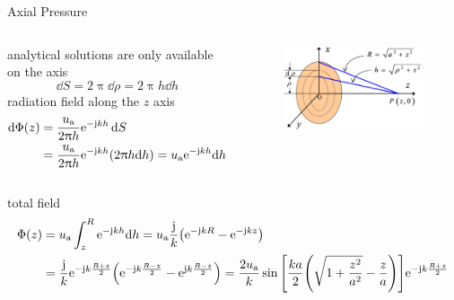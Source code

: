 \documentclass[9pt,mathserif]{beamer}
\begin{document}
\begin{frame}{Axial Pressure}
	\begin{columns}
		\begin{outline}
			\1 analytical solutions are only available on the axis
			$$\dd S  =2\uppi \dd \rho = 2\uppi h \dd h$$
			\1 radiation field along the $z$ axis
			\begin{align*}
				\dd \Phi(z) &= \frac{u_\text{a}}{2\uppi h} \mathrm{e}^{-\mathrm{j} k h}\dd{S}\\
				&= \frac{u_\text{a}}{2\uppi h} \mathrm{e}^{-\mathrm{j} k h} (2\uppi h \dd h)
				=u_\text{a} \mathrm{e}^{-\mathrm{j} kh} \dd h
			\end{align*}
		\end{outline}
		\column{0.5\textwidth}
		\begin{figure}
			\centering
			\includegraphics[width=\textwidth]{img/radi/circularPistonSourceAxis.jpg}
		\end{figure}
	\end{columns}
	\begin{outline}
		\1 total field
		\begin{align*}
			\Phi(z) &= u_\text{a} \int_z^R \mathrm{e}^{-\mathrm{j} kh}\dd h
			=  u_\text{a}\frac{\mathrm{j}}{k} \qty(\mathrm{e}^{-\mathrm{j} k R} -\mathrm{e}^{-\mathrm{j} k z})\\
			& = \frac{\mathrm{j}}{k} \mathrm{e}^{-\mathrm{j} k \frac{R+z}{2}}\qty(
			\mathrm{e}^{-\mathrm{j} k \frac{R-z}{2}} - \mathrm{e}^{\mathrm{j} k \frac{R-z}{2}})
			 = \frac{2u_\text{a}}{k} 
			\sin \qty[\frac{ka}{2}\qty(\sqrt{1+\frac{z^2}{a^2}}-\frac{z}{a})]
			\mathrm{e}^{-\mathrm{j} k \frac{R+z}{2}}
		\end{align*}
	\end{outline}
\end{frame}
\end{document}
